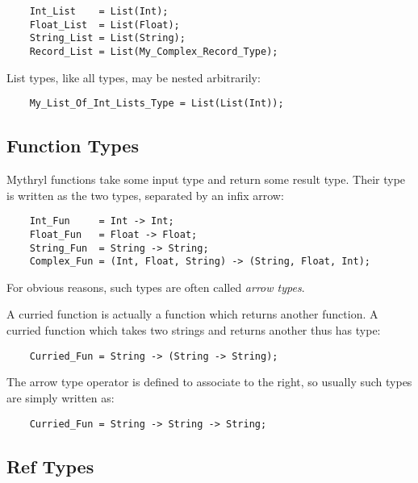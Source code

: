 \begin{verbatim}
    Int_List    = List(Int);
    Float_List  = List(Float);
    String_List = List(String);
    Record_List = List(My_Complex_Record_Type);
\end{verbatim}

List types, like all types, may be nested arbitrarily:

\begin{verbatim}
    My_List_Of_Int_Lists_Type = List(List(Int));
\end{verbatim}

\cutend*


\subsection{Function Types}
\label{section:ref:types:function-types}

Mythryl functions take some input type and return some 
result type.  Their type is written as the two types, 
separated by an infix arrow:

\begin{verbatim}
    Int_Fun     = Int -> Int;
    Float_Fun   = Float -> Float;
    String_Fun  = String -> String;
    Complex_Fun = (Int, Float, String) -> (String, Float, Int);
\end{verbatim}

For obvious reasons, such types are often called {\it arrow types}.

A curried function is actually a function which returns another 
function.  A curried function which takes two strings and returns 
another thus has type:

\begin{verbatim}
    Curried_Fun = String -> (String -> String);
\end{verbatim}

The arrow type operator is defined to associate to the right, so 
usually such types are simply written as:

\begin{verbatim}
    Curried_Fun = String -> String -> String;
\end{verbatim}

\cutend*


\subsection{Ref Types}
\label{section:ref:types:ref-types}

